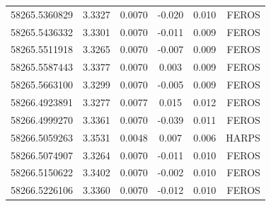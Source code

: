 \documentclass[useAMS,usenatbib]{mnras}
\begin{document}
\begin{table}
\begin{tabular}{@{}lccccr@{}}
58265.5360829 & 3.3327 & 0.0070 & -0.020 & 0.010 & FEROS \\
58265.5436332 & 3.3301 & 0.0070 & -0.011 & 0.009 & FEROS \\
58265.5511918 & 3.3265 & 0.0070 & -0.007 & 0.009 & FEROS \\
58265.5587443 & 3.3377 & 0.0070 &  0.003 & 0.009 & FEROS \\
58265.5663100 & 3.3299 & 0.0070 & -0.005 & 0.009 & FEROS \\
58266.4923891 & 3.3277 & 0.0077 &  0.015 & 0.012 & FEROS \\
58266.4999270 & 3.3361 & 0.0070 & -0.039 & 0.011 & FEROS \\
58266.5059263 & 3.3531 & 0.0048 &  0.007 & 0.006 & HARPS \\
58266.5074907 & 3.3264 & 0.0070 & -0.011 & 0.010 & FEROS \\
58266.5150622 & 3.3402 & 0.0070 & -0.002 & 0.010 & FEROS \\
58266.5226106 & 3.3360 & 0.0070 & -0.012 & 0.010 & FEROS \\
\hline

\end{tabular}
\end{table}

\label{lastpage}
\end{document}
